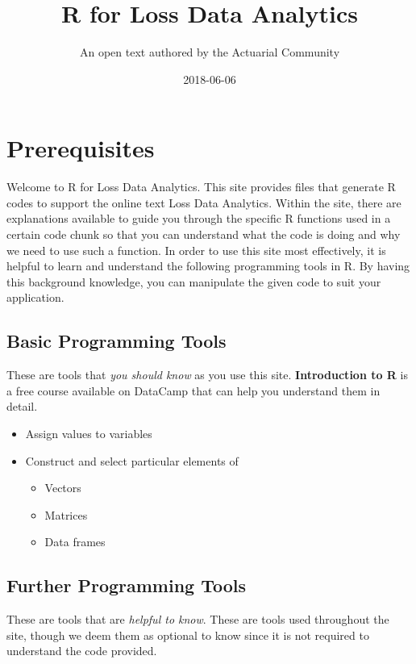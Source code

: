 \documentclass[]{book}
\title{R for Loss Data Analytics}
\author{An open text authored by the Actuarial Community}
\date{2018-06-06}
\providecommand{\tightlist}{%
  \setlength{\itemsep}{0pt}\setlength{\parskip}{0pt}}
\theoremstyle{definition}
\theoremstyle{definition}
\theoremstyle{definition}
\theoremstyle{remark}
\begin{document}
\maketitle

{
\setcounter{tocdepth}{1}
\tableofcontents
}
\chapter{Prerequisites}\label{prerequisites}

Welcome to R for Loss Data Analytics. This site provides files that
generate R codes to support the online text Loss Data Analytics. Within
the site, there are explanations available to guide you through the
specific R functions used in a certain code chunk so that you can
understand what the code is doing and why we need to use such a
function. In order to use this site most effectively, it is helpful to
learn and understand the following programming tools in R. By having
this background knowledge, you can manipulate the given code to suit
your application.

\section{Basic Programming Tools}\label{basic-programming-tools}

These are tools that \emph{you should know} as you use this site.
\textbf{Introduction to R} is a free course available on DataCamp that
can help you understand them in detail.

\begin{itemize}
\tightlist
\item
  Assign values to variables
\item
  Construct and select particular elements of

  \begin{itemize}
  \tightlist
  \item
    Vectors
  \item
    Matrices
  \item
    Data frames
  \end{itemize}
\end{itemize}

\section{Further Programming Tools}\label{further-programming-tools}

These are tools that are \emph{helpful to know}. These are tools used
throughout the site, though we deem them as optional to know since it is
not required to understand the code provided.
\end{document}

